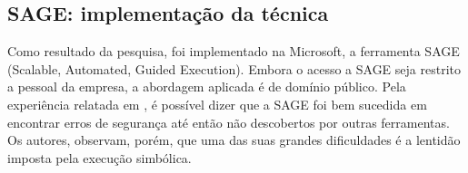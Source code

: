 		\subsection{SAGE: implementação da técnica}
			Como resultado da pesquisa, foi implementado na Microsoft, a ferramenta SAGE
			(Scalable, Automated, Guided Execution).
			Embora o acesso a SAGE seja restrito a pessoal da empresa, a abordagem aplicada
			é de domínio público.
			Pela experiência relatada em \cite{Godefroid2008}, é possível dizer que
			a SAGE foi bem sucedida em encontrar erros de segurança até então não
			descobertos por outras ferramentas.
			Os autores, observam, porém, que uma das suas grandes dificuldades é a lentidão
			imposta pela execução simbólica.
				

